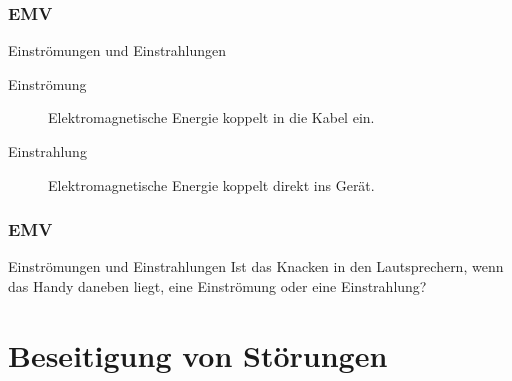 \begin{frame}
  \frametitle{EMV}
  \begin{center}
    \begin{block}{Einströmungen und Einstrahlungen}
      \begin{description}
        \item[Einströmung] Elektromagnetische Energie koppelt in die Kabel ein. \\
        \item[Einstrahlung] Elektromagnetische Energie koppelt direkt ins Gerät.
      \end{description}
    \end{block}
  \end{center}
\end{frame}

\begin{frame}
  \frametitle{EMV}
  \begin{center}
    \begin{exampleblock}{Einströmungen und Einstrahlungen}
      Ist das Knacken in den Lautsprechern, wenn das Handy daneben liegt, eine Einströmung oder eine Einstrahlung?
    \end{exampleblock}
  \end{center}
\end{frame}

\section*{Beseitigung von Störungen}

